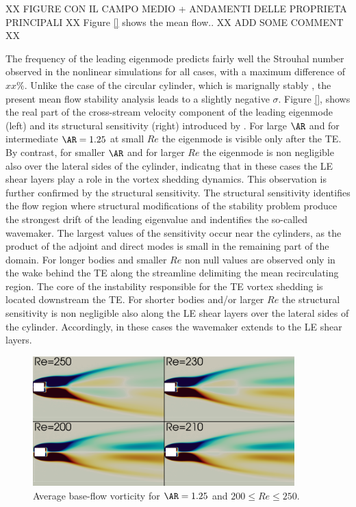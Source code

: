 XX FIGURE CON IL CAMPO MEDIO + ANDAMENTI DELLE PROPRIETA PRINCIPALI XX
Figure \ref{} shows the mean flow.. XX ADD SOME COMMENT XX

The frequency of the leading eigenmode predicts fairly well the Strouhal number observed in the nonlinear simulations for all cases, with a maximum difference of $xx\%$. Unlike the case of the circular cylinder, which is marignally stably \citep{barkley-2006}, the present mean flow stability analysis leads to a slightly negative $\sigma$. Figure \ref{}, shows the real part of the cross-stream velocity component of the leading eigenmode (left) and its structural sensitivity (right) introduced by \cite{giannetti-luchini-2007}. For large $\AR$ and for intermediate $\AR=1.25$ at small $Re$ the eigenmode is visible only after the TE. By contrast, for smaller $\AR$ and for larger $Re$ the eigenmode is non negligible also over the lateral sides of the cylinder, indicatng that in these cases the LE shear layers play a role in the vortex shedding dynamics. This observation is further confirmed by the structural sensitivity. The structural sensitivity identifies the flow region where structural modifications of the stability problem produce the strongest drift of the leading eigenvalue and indentifies the so-called wavemaker. The largest values of the sensitivity occur near the cylinders, as the
product of the adjoint and direct modes is small in the remaining part of the domain. For longer bodies and smaller $Re$ non null values are observed only in the wake behind the TE along the streamline delimiting the mean recirculating region. The core of the instability responsible for the TE vortex shedding is located downstream the TE. For shorter bodies and/or larger $Re$ the structural sensitivity is non negligible also along the LE shear layers over the lateral sides of the cylinder. Accordingly, in these cases the wavemaker extends to the LE shear layers.

\begin{figure}
  \centering
  \includegraphics[width=0.9\textwidth]{./fig/AR1p25/Av_BF_Re200_Re250.png}
  \caption{Average base-flow vorticity for $\AR=1.25$ and $200 \le Re \le 250$.}
  \label{fig:av_bf}
\end{figure}

